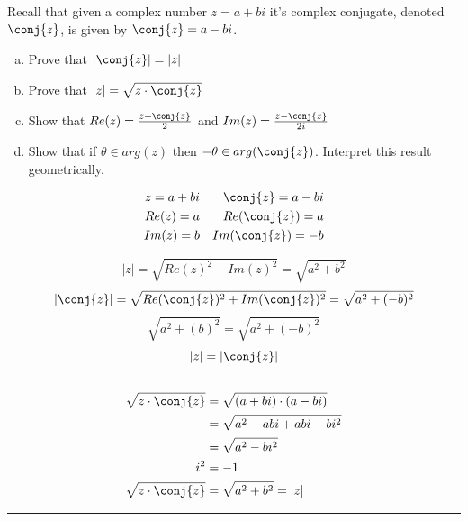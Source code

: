 \begin{problem}[81.]
Recall that given a complex number $z = a + bi$ it's complex conjugate, denoted $\conj{z}$, is given by $\conj{z} = a - bi$.

\begin{enumerate}[(a)]
    \item Prove that $|\conj{z}| = |z|$
    \item Prove that $|z| = \sqrt{z \cdot \conj{z}}$
    \item Show that $Re(z) = \frac{z + \conj{z}}{2}$ and $Im(z) = \frac{z - \conj{z}}{2i}$
    \item Show that if $\theta \in arg(z)$ then $-\theta \in arg(\conj{z})$. Interpret this result geometrically. 
\end{enumerate} 
\end{problem}

\begin{solution}[(a) Prove that $|\conj{z}| = |z|$]

    \begin{align}
        z = a + bi && \conj{z} = a - bi \\
        Re(z) = a && Re(\conj{z}) = a \\
        Im(z) = b && Im(\conj{z}) = -b
    \end{align}
    
    \[|z| = \sqrt{Re(z)^2 + Im(z)^2} = \sqrt{a^2 + b^2}\]
    \[|\conj{z}| = \sqrt{Re(\conj{z})^2 + Im(\conj{z})^2} = \sqrt{a^2 + (-b)^2}\]
    \[\sqrt{a^2 + (b)^2} = \sqrt{a^2 + (-b)^2}\]
    \[|z| = |\conj{z}|\]
\end{solution}

\hrule \medskip 

\begin{solution}[(b) Prove that $|z| = \sqrt{z \cdot \conj{z}}$]
    \begin{align}
        \sqrt{z \cdot \conj{z}} &= \sqrt{(a + bi) \cdot (a - bi)} \\
        &= \sqrt{a^2 - abi + abi - bi^2} \\
        &= \sqrt{a^2 - bi^2} \\
        i^2 &= -1 \\
        \sqrt{z \cdot \conj{z}} &= \sqrt{a^2 + b^2} = |z|
    \end{align}
\end{solution}

\hrule \medskip 

